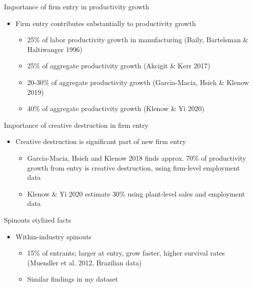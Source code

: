\documentclass[english,usenames,dvipsnames]{beamer}
\begin{document}
\begin{frame}{Importance of firm entry in productivity growth}\label{motivation:importance_of_firm_entry}
	\hyperlink{motivation_background}{}
	\begin{itemize}
		\item Firm entry contributes substantially to productivity growth
		\begin{itemize}
			\item 25\% of labor productivity growth in manufacturing (Baily, Bartelsman \& Haltiwanger 1996)
			\item 25\% of aggregate productivity growth (Akcigit \& Kerr 2017)
			\item 20-30\% of aggregate productivity growth (Garcia-Macia, Hsieh \& Klenow 2019)
			\item 40\% of aggregate productivity growth (Klenow \& Yi 2020)
		\end{itemize}
	\end{itemize}
\end{frame}

\begin{frame}{Importance of creative destruction in firm entry}\label{motivation:importance_of_creative_destruction}
	\hyperlink{motivation_background}{}
	\begin{itemize}
		\item Creative destruction is significant part of new firm entry
		\begin{itemize}
			\item Garcia-Macia, Hsieh and Klenow 2018 finds approx. 70\% of productivity growth from entry is creative destruction, using firm-level employment data
			\item Klenow \& Yi 2020 estimate 30\% using plant-level sales and employment data
		\end{itemize}
	\end{itemize}
\end{frame}



\begin{frame}{Spinouts stylized facts}\label{spinouts_facts_from_literature}
\hyperlink{motivation}{}
	\begin{itemize}
	\item Within-industry spinouts
		\begin{itemize}
		\item 15\% of entrants; larger at entry, grow faster, higher survival rates (Muendler et al. 2012, Brazilian data)
		\item Similar findings in my dataset
		\end{itemize}
	\end{itemize}
\end{frame}
\end{document}
